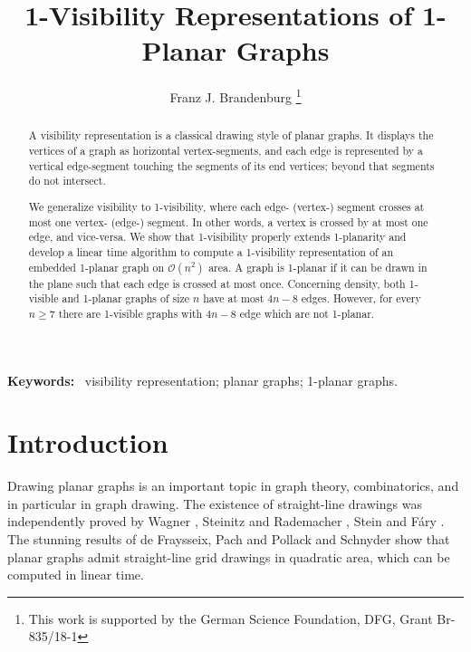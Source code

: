 \documentclass[runningheads]{llncs}
\begin{document}

\title {1-Visibility Representations of 1-Planar Graphs}

\author{Franz J. Brandenburg
\thanks{This work is supported by the German Science Foundation, DFG, Grant
 Br-835/18-1}}

\maketitle

\begin{abstract}
A visibility representation is a classical drawing style of planar
graphs. It displays the vertices of a graph as  horizontal
vertex-segments, and each edge is represented by a vertical
edge-segment touching the segments of its end vertices; beyond that
segments do not intersect.

We generalize visibility to 1-visibility, where each edge- (vertex-)
segment crosses at most one vertex- (edge-) segment. In other words,
a vertex is crossed by at most one edge, and vice-versa. We show
that 1-visibility properly extends 1-planarity and develop a linear
time algorithm to compute a 1-visibility representation of an
embedded 1-planar graph on $\mathcal{O}(n^2)$ area. A graph is
1-planar if it can be drawn in the plane such that each edge is
crossed at most once.
 Concerning  density, both 1-visible and
1-planar graphs of size $n$ have at most $4n-8$ edges. However, for
every $n \geq 7$  there are 1-visible graphs with $4n-8$ edge which
are not 1-planar.

\end{abstract}


{\bf Keywords:} \, visibility representation; planar graphs;
1-planar graphs.


\section{Introduction}



 Drawing planar graphs is an important topic in graph theory,
 combinatorics, and in particular in graph drawing. The existence of
straight-line drawings was independently proved by Wagner
\cite{w-bv-36}, Steinitz and Rademacher \cite{sr-34}, Stein
\cite{s-cm-51} and F\'{a}ry \cite{fary-48}. The stunning results of
de Fraysseix, Pach and Pollack \cite{fpp-hdpgg-90} and Schnyder
\cite{S-epgg-90} show that planar graphs admit straight-line grid
drawings in quadratic area, which can be computed in linear time.
\end{document}
